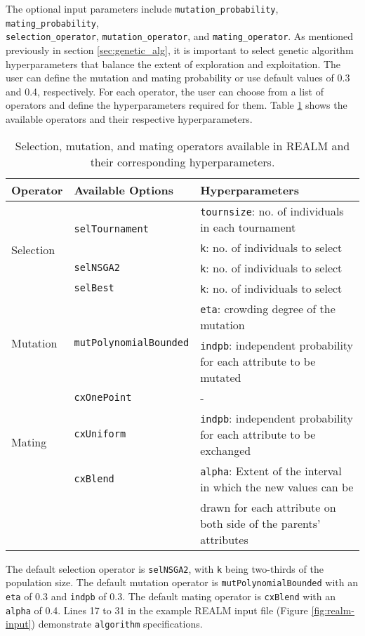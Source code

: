 The optional input parameters include \texttt{mutation\_probability}, 
\texttt{mating\_probability}, \\ \texttt{selection\_operator}, 
\texttt{mutation\_operator}, and \texttt{mating\_operator}. 
As mentioned previously in section \ref{sec:genetic_alg}, it is important to 
select genetic algorithm hyperparameters that balance the extent of exploration 
and exploitation.
The user can define the mutation and mating probability or use default values 
of 0.3 and 0.4, respectively. 
For each operator, the user can choose from a list of operators and define the
hyperparameters required for them. 
Table \ref{tab:deap_operators} shows the available operators and their respective 
hyperparameters. 
\begin{table}[]
    \centering
    \onehalfspacing
    \caption{Selection, mutation, and mating operators available in REALM 
    and their corresponding hyperparameters. }
	\label{tab:deap_operators}
    \small
    \begin{tabular}{l|p{3.7cm}|l}
    \hline
    \textbf{Operator} & \textbf{Available Options} & \textbf{Hyperparameters} \\ \hline
    \multirow{4}{1cm}{Selection} & \multirow{2}{2cm}{\texttt{selTournament}} & \texttt{tournsize}: no. of individuals in each tournament\\ 
    & & \texttt{k}: no. of individuals to select \\ \cline{2-3}
    & \texttt{selNSGA2} & \texttt{k}: no. of individuals to select\\ \cline{2-3}
    & \texttt{selBest} & \texttt{k}: no. of individuals to select\\ \hline
    \multirow{2}{1cm}{Mutation} & \multirow{2}{2cm}{\texttt{mutPolynomialBounded}} & \texttt{eta}: crowding degree of the mutation\\  
    && \texttt{indpb}: independent probability for each attribute to be mutated\\ \hline
    \multirow{3}{1cm}{Mating} & \texttt{cxOnePoint} & -\\ \cline{2-3}
    & \texttt{cxUniform} & \texttt{indpb}: independent probability for each attribute to be exchanged\\ \cline{2-3}
    & \texttt{cxBlend} & \texttt{alpha}: Extent of the interval in which the new values can be \\
    &&drawn for each attribute on both side of the parents’ attributes\\ \hline
    \end{tabular}
    \end{table}
The default selection operator is \texttt{selNSGA2}, with
\texttt{k} being two-thirds of the population size. 
The default mutation operator is \texttt{mutPolynomialBounded} with an  
\texttt{eta} of 0.3 and \texttt{indpb} of 0.3. 
The default mating operator is \texttt{cxBlend} with an \texttt{alpha} of 0.4. 
Lines 17 to 31 in the example REALM input file (Figure \ref{fig:realm-input}) 
demonstrate \texttt{algorithm} specifications. 

